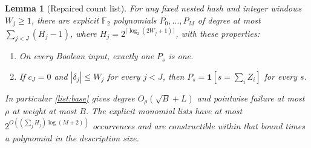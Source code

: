 \documentclass[11pt,letterpaper]{article}
\newtheorem{lemma}[theorem]{Lemma}
\theoremstyle{definition}
\theoremstyle{remark}
\newcommand{\F}{\mathbb F}
\newcommand{\ind}{\mathbf 1}
\begin{document}
\begin{lemma}[Repaired count list]
\label{list:repair}
For any fixed nested hash and integer windows $W_j\ge1$, there are
explicit $\F_2$ polynomials $P_0,\ldots,P_M$ of degree at most
$\sum_{j<J}(H_j-1)$, where
$H_j=2^{\lceil\log_2(2W_j+1)\rceil}$, with these properties:
\begin{enumerate}
\item On every Boolean input, exactly one $P_s$ is one.
\item If $c_J=0$ and $|\delta_j|\le W_j$ for every $j<J$, then
$P_s=\ind[s=\sum_i Z_i]$ for every $s$.
\end{enumerate}
In particular \cref{list:base} gives degree $O_\rho(\sqrt B+L)$
and pointwise failure at most $\rho$ at weight at most $B$.
The explicit monomial lists have at most
$2^{O((\sum_jH_j)\log(M+2))}$ occurrences and are constructible
within that bound times a polynomial in the description size.
\end{lemma}
\end{document}
